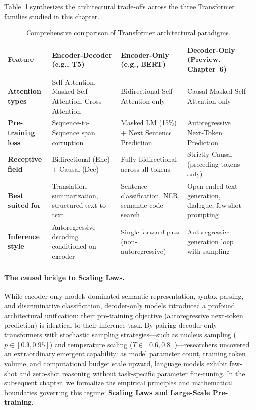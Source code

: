 \documentclass[../../main.tex]{subfiles}
\begin{document}
Table~\ref{tab:transformer_paradigm_comparison} synthesizes the architectural trade-offs across the three Transformer families studied in this chapter.

\begin{table}[htbp]
\centering
\small
\caption{Comprehensive comparison of Transformer architectural paradigms.}
\label{tab:transformer_paradigm_comparison}
\begin{tabularx}{\textwidth}{lXXX}
\toprule
\textbf{Feature} & \textbf{Encoder-Decoder (e.g., T5)} & \textbf{Encoder-Only (e.g., BERT)} & \textbf{Decoder-Only (Preview: Chapter~6)} \\
\midrule
\textbf{Attention types} & Self-Attention, Masked Self-Attention, Cross-Attention & Bidirectional Self-Attention only & Causal Masked Self-Attention only \\
\textbf{Pre-training loss} & Sequence-to-Sequence span corruption & Masked LM (15\%) $+$ Next Sentence Prediction & Autoregressive Next-Token Prediction \\
\textbf{Receptive field} & Bidirectional (Enc) $+$ Causal (Dec) & Fully Bidirectional across all tokens & Strictly Causal (preceding tokens only) \\
\textbf{Best suited for} & Translation, summarization, structured text-to-text & Sentence classification, NER, semantic code search & Open-ended text generation, dialogue, few-shot prompting \\
\textbf{Inference style} & Autoregressive decoding conditioned on encoder & Single forward pass (non-autoregressive) & Autoregressive generation loop with sampling \\
\bottomrule
\end{tabularx}
\end{table}

\paragraph{The causal bridge to Scaling Laws.}
While encoder-only models dominated semantic representation, syntax parsing, and discriminative classification, decoder-only models introduced a profound architectural unification: their pre-training objective (autoregressive next-token prediction) is identical to their inference task.
By pairing decoder-only transformers with stochastic sampling strategies---such as nucleus sampling ($p \in [0.9, 0.95]$) and temperature scaling ($T \in [0.6, 0.8]$)---researchers uncovered an extraordinary emergent capability: as model parameter count, training token volume, and computational budget scale upward, language models exhibit few-shot and zero-shot reasoning without task-specific parameter fine-tuning.
In the subsequent chapter, we formalize the empirical principles and mathematical boundaries governing this regime: \textbf{Scaling Laws and Large-Scale Pre-training}.

\clearpage
\thispagestyle{empty}
\null
\clearpage
\end{document}
